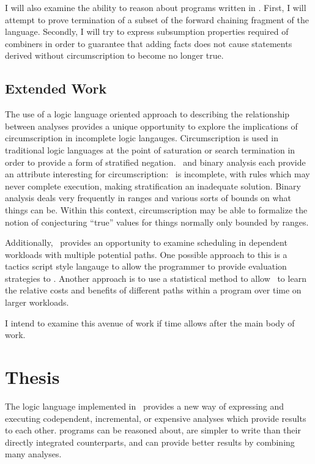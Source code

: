 I will also examine the ability to reason about programs written in \sysname.
First, I will attempt to prove termination of a subset of the forward chaining fragment of the language.
Secondly, I will try to express subsumption properties required of combiners in order to guarantee that adding facts does not cause statements derived without circumscription to become no longer true.
\subsection{Extended Work}
The use of a logic language oriented approach to describing the relationship between analyses provides a unique opportunity to explore the implications of circumscription in incomplete logic langauges.
Circumscription is used in traditional logic languages at the point of saturation or search termination in order to provide a form of stratified negation.
\sysname\ and binary analysis each provide an attribute interesting for circumscription:
\sysname\ is incomplete, with rules which may never complete execution, making stratification an inadequate solution.
Binary analysis deals very frequently in ranges and various sorts of bounds on what things can be.
Within this context, circumscription may be able to formalize the notion of conjecturing ``true'' values for things normally only bounded by ranges.

Additionally, \sysname\ provides an opportunity to examine scheduling in dependent workloads with multiple potential paths.
One possible approach to this is a tactics script style langauge to allow the programmer to provide evaluation strategies to \sysname.
Another approach is to use a statistical method to allow \sysname\ to learn the relative costs and benefits of different paths within a program over time on larger workloads.

I intend to examine this avenue of work if time allows after the main body of work.
\section{Thesis}
The logic language implemented in \sysname\ provides a new way of expressing and executing codependent, incremental, or expensive analyses which provide results to each other. \sysname programs can be reasoned about, are simpler to write than their directly integrated counterparts, and can provide better results by combining many analyses.
